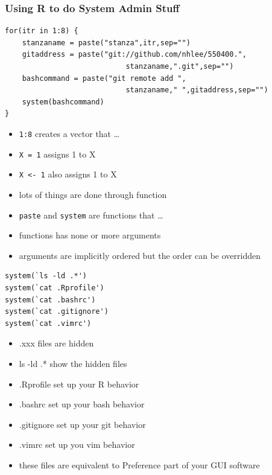 \documentclass[hyperref={colorlinks=false},handout,10pt]{beamer}
\let\olditem\item
\renewcommand{\item}{\setlength{\itemsep}{0.5\baselineskip}\olditem}
\begin{document}
\begin{frame}
    \frametitle{Using R to do System Admin Stuff}
    \begin{lstlisting}
for(itr in 1:8) {
    stanzaname = paste("stanza",itr,sep="")
    gitaddress = paste("git://github.com/nhlee/550400.",
                            stanzaname,".git",sep="")
    bashcommand = paste("git remote add ",
                            stanzaname," ",gitaddress,sep="")
    system(bashcommand)
}
    \end{lstlisting}
    \begin{itemize}
        \item \texttt{1:8} creates a vector that \ldots 
        \item \texttt{X = 1} assigns 1 to X 
        \item \texttt{X <- 1} also assigns 1 to X
        \item lots of things are done through function 
        \item \texttt{paste} and \texttt{system} are functions that \ldots 
        \item functions has none or more arguments 
        \item arguments are implicitly ordered but the order can be overridden
    \end{itemize}
    \begin{lstlisting}
system(`ls -ld .*')
system(`cat .Rprofile')
system(`cat .bashrc')
system(`cat .gitignore')
system(`cat .vimrc')
    \end{lstlisting}
    \begin{itemize}
        \item .xxx files are hidden
        \item ls -ld .* show the hidden files
        \item .Rprofile set up your R behavior
        \item .bashrc set up your bash behavior
        \item .gitignore set up your git behavior 
        \item .vimrc set up you vim behavior
        \item these files are equivalent to Preference part of your GUI
            software
    \end{itemize}
\end{frame}
\end{document}
